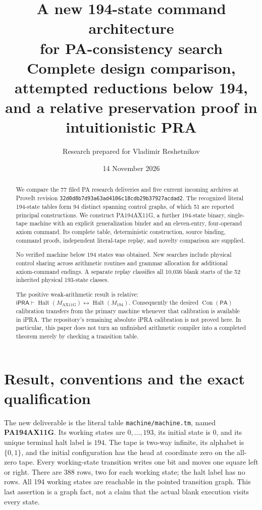 \documentclass[11pt,letterpaper]{article}
\title{A new 194-state command architecture\\for PA-consistency search\\[5pt]
 \large Complete design comparison, attempted reductions below 194,\\
 and a relative preservation proof in intuitionistic PRA}
\author{Research prepared for Vladimir Reshetnikov}
\date{14 November 2026}
\newcommand{\ipra}{\mathsf{iPRA}}
\newcommand{\pa}{\mathsf{PA}}
\newcommand{\Con}{\operatorname{Con}}
\newcommand{\Halt}{\operatorname{Halt}}
\newcommand{\file}[1]{\texttt{\nolinkurl{#1}}}
\newcommand{\Mnew}{M_{\mathrm{AX11G}}}
\newcommand{\Mold}{M_{194}}
\begin{document}
\maketitle
\begin{abstract}
We compare the 77 filed PA research deliveries and five current incoming
archives at ProveIt revision
\texttt{32d0d8b7d93a63ad4106c18cdb29b37927acdad2}.
The recognized literal 194-state tables form 94 distinct spanning control
graphs, of which 51 are reported principal constructions. We construct
PA194AX11G, a further 194-state binary, single-tape machine with an explicit
generalization binder and an eleven-entry, four-operand axiom command.
Its complete table, deterministic construction, source binding, command
proofs, independent literal-tape replay, and novelty comparison are supplied.

No verified machine below 194 states was obtained. New searches include
physical control sharing across arithmetic routines and grammar allocation
for additional axiom-command endings. A separate replay classifies all
10,036 blank starts of the 52 inherited physical 193-state classes.

The positive weak-arithmetic result is relative:
$\ipra\vdash\Halt(\Mnew)\leftrightarrow\Halt(\Mold)$.
Consequently the desired $\Con(\pa)$ calibration transfers from the
primary machine whenever that calibration is available in iPRA.
The repository's remaining absolute iPRA calibration is not proved here.
In particular, this paper does not turn an unfinished arithmetic compiler
into a completed theorem merely by checking a transition table.
\end{abstract}
\clearpage
\tableofcontents
\clearpage

\section{Result, conventions and the exact qualification}
\label{sec:result}

The new deliverable is the literal table \file{machine/machine.tm}, named
\textbf{PA194AX11G}. Its working states are $0,\ldots,193$, its initial
state is $0$, and its unique terminal halt label is $194$. The tape is
two-way infinite, its alphabet is $\{0,1\}$, and the initial configuration
has the head at coordinate zero on the all-zero tape. Every working-state
transition writes one bit and moves one square left or right. There are
388 rows, two for each working state; the halt label has no rows. All
194 working states are reachable in the pointed transition graph. This
last assertion is a graph fact, not a claim that the actual blank execution
visits every state.
\end{document}

